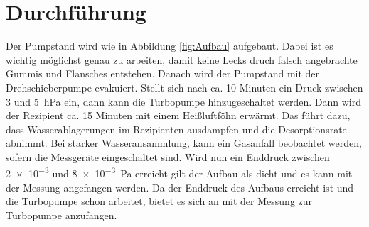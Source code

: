 \section{Durchführung}
\label{sec:Durchführung}
Der Pumpstand wird wie in Abbildung \ref{fig:Aufbau} aufgebaut. Dabei ist es wichtig möglichst genau 
zu arbeiten, damit keine Lecks druch falsch angebrachte Gummis und Flansches entstehen. Danach wird 
der Pumpstand mit der Drehschieberpumpe evakuiert. Stellt sich nach ca. 10 Minuten ein Druck 
zwischen 3 und \SI{5}{\hecto\pascal} ein, dann kann die Turbopumpe hinzugeschaltet werden. 
Dann wird der Rezipient ca. 15 Minuten mit einem Heißluftföhn erwärmt. Das 
führt dazu, dass Wasserablagerungen im Rezipienten ausdampfen und die Desorptionsrate 
abnimmt. Bei starker Wasseransammlung, kann ein Gasanfall beobachtet werden, sofern die 
Messgeräte eingeschaltet sind. Wird nun ein Enddruck zwischen \SI{2e-3}{} und \SI{8e-3}{\pascal} 
erreicht gilt der Aufbau als dicht und es kann mit der Messung angefangen werden.
\newline
Da der Enddruck des Aufbaus erreicht ist und die Turbopumpe schon arbeitet, bietet es sich an 
mit der Messung zur Turbopumpe anzufangen.  
